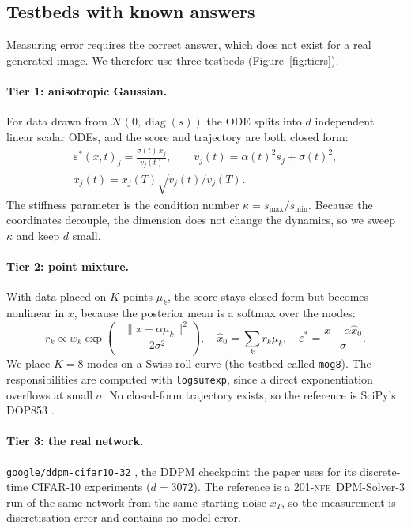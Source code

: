 \documentclass[sigconf]{acmart}
\newcommand{\NFE}{\textsc{nfe}}
\newcommand{\eps}{\varepsilon}
\begin{document}
\subsection{Testbeds with known answers}

Measuring error requires the correct answer, which does not exist for a real
generated image. We therefore use three testbeds (Figure~\ref{fig:tiers}).

\paragraph{Tier 1: anisotropic Gaussian.} For data drawn from
$\mathcal N(0,\operatorname{diag}(s))$ the ODE splits into $d$ independent
linear scalar ODEs, and the score and trajectory are both closed form:
\begin{equation}
\begin{gathered}
\eps^*(x,t)_j=\frac{\sigma(t)\,x_j}{v_j(t)},\qquad
v_j(t)=\alpha(t)^2s_j+\sigma(t)^2,\\
x_j(t)=x_j(T)\sqrt{v_j(t)/v_j(T)}.
\end{gathered}
\end{equation}
The stiffness parameter is the condition number $\kappa=s_{\max}/s_{\min}$.
Because the coordinates decouple, the dimension does not change the dynamics,
so we sweep $\kappa$ and keep $d$ small.

\paragraph{Tier 2: point mixture.} With data placed on $K$ points $\mu_k$, the
score stays closed form but becomes nonlinear in $x$, because the posterior mean
is a softmax over the modes:
\begin{equation}
r_k\propto w_k\exp\!\left(-\frac{\lVert x-\alpha\mu_k\rVert^2}{2\sigma^2}\right),\quad
\hat x_0=\sum_k r_k\mu_k,\quad
\eps^*=\frac{x-\alpha\hat x_0}{\sigma}.
\end{equation}
We place $K=8$ modes on a Swiss-roll curve (the testbed called \texttt{mog8}).
The responsibilities are computed with \texttt{logsumexp}, since a direct
exponentiation overflows at small $\sigma$. No closed-form trajectory exists, so
the reference is SciPy's DOP853 \cite{dormand1980family,hairer1993solving,virtanen2020scipy}.

\paragraph{Tier 3: the real network.} \texttt{google/ddpm-cifar10-32}
\cite{ddpmcifar10checkpoint,ho2020ddpm}, the DDPM checkpoint the paper uses for
its discrete-time CIFAR-10 \cite{krizhevsky2009cifar} experiments ($d=3072$).
The reference is a 201-\NFE\ DPM-Solver-3 run of the same network from the same
starting noise $x_T$, so the measurement is discretisation error and contains no
model error.
\end{document}
